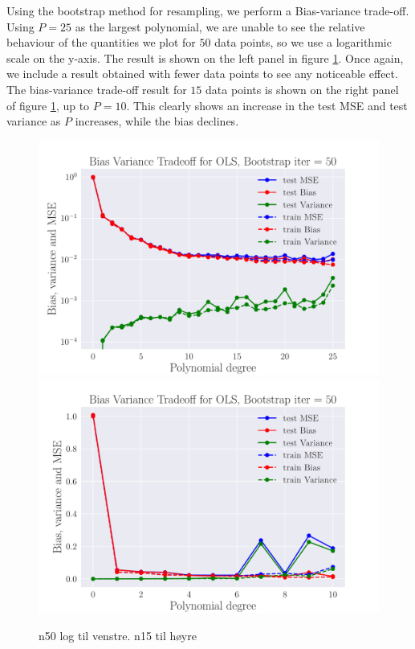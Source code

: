 \documentclass[reprint,english,notitlepage,aps,nobalancelastpage,nofootinbib]{revtex4-1}  %
\begin{document}
Using the bootstrap method for resampling, we perform a Bias-variance trade-off. Using $P=25$ as the largest polynomial, we are unable to see the relative behaviour of the quantities we plot for $50$ data points, so we use a logarithmic scale on the y-axis. The result is shown on the left panel in figure \ref{fig:terrain_OLS_BVT}. Once again, we include a result obtained with fewer data points to see any noticeable effect. The bias-variance trade-off result for $15$ data points is shown on the right panel of figure \ref{fig:terrain_OLS_BVT}, up to $P=10$. This clearly shows an increase in the test MSE and test variance as $P$ increases, while the bias declines.
\begin{figure}[H]
	\includegraphics[width=\linewidth]{SRTM_BVT_OLS_n50_log.pdf}
	\endminipage\hfill
	\includegraphics[width=\linewidth]{SRTM_BVT_OLS_n15.pdf}
	\endminipage
	\caption{n50 log til venstre. n15 til høyre}
  \label{fig:terrain_OLS_BVT}
\end{figure}
\end{document}
